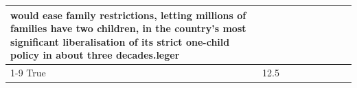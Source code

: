 \begin{table}[H]
\begin{tabular}{lllrlllll}
would ease family restrictions, letting millions of families have two children, in the country's most significant liberalisation of its strict one-child policy in about three decades.leger \\
\cline{1-9}
True & 12.5%
\end{tabular}
\end{table}
